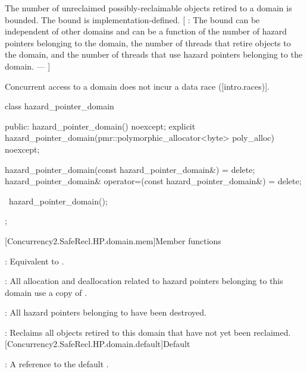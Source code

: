 \pnum
The number of unreclaimed possibly-reclaimable objects retired to a domain is bounded.
The bound is implementation-defined. [ : The bound can be independent of other
domains and can be a function of the number of hazard pointers belonging to the
domain, the number of threads that retire objects to the domain, and the number of
threads that use hazard pointers belonging to the domain. ---  ]

\pnum
Concurrent access to a domain does not incur a data race ([intro.races)].

\begin{codeblock}
class hazard_pointer_domain {
public:
  hazard_pointer_domain() noexcept;
  explicit hazard_pointer_domain(pmr::polymorphic_allocator<byte> poly_alloc) noexcept;

  hazard_pointer_domain(const hazard_pointer_domain&) = delete;
  hazard_pointer_domain& operator=(const hazard_pointer_domain&) = delete;

  ~hazard_pointer_domain();
};
\end{codeblock}

[Concurrency2.SafeRecl.HP.domain.mem]{Member functions}


\pnum
{}: Equivalent to .
\\


\pnum
{}: All allocation and deallocation related to hazard pointers belonging to this
domain use a copy of .
\\


\pnum
{}: All hazard pointers belonging to  have been destroyed.

\pnum
{}: Reclaims all objects retired to this domain that have not yet been reclaimed.
\\

[Concurrency2.SafeRecl.HP.domain.default]{Default }


\pnum
{}: A reference to the default .

